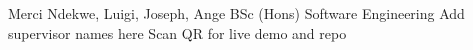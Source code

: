\projectmeta%
  {Merci Ndekwe, Luigi, Joseph, Ange}%
  {BSc (Hons) Software Engineering}%
  {Add supervisor names here}%
  {Scan QR for live demo and repo}

\vspace{0.5em}
\begin{center}
\end{center}
